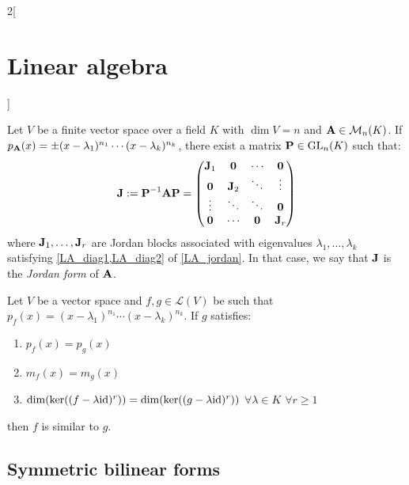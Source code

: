 \documentclass[../../../main.tex]{subfiles}
\begin{document}
\begin{multicols}{2}[\section{Linear algebra}]
\begin{proposition}
\begin{enumerate}
    \end{enumerate}
  \end{proposition}
  \begin{proposition}
    Let $V$ be a finite vector space over a field $K$ with $\dim V=n$ and $\boldsymbol{\mathrm{A}}\in\mathcal{M}_n(K)$. If $p_{\boldsymbol{\mathrm{A}}}(x)=\pm(x-\lambda_1)^{n_1}\cdots(x-\lambda_k)^{n_k}$, there exist a matrix $\boldsymbol{\mathrm{P}}\in\mathrm{GL}_n(K)$ such that:
    $$\boldsymbol{\mathrm{J}}:=\boldsymbol{\mathrm{P}}^{-1}\boldsymbol{\mathrm{A}}\boldsymbol{\mathrm{P}}=
      \begin{pmatrix}
        \boldsymbol{\mathrm{J}}_1 & \boldsymbol{\mathrm{0}}   & \cdots & \boldsymbol{\mathrm{0}}   \\
        \boldsymbol{\mathrm{0}}   & \boldsymbol{\mathrm{J}}_2 & \ddots & \vdots   \\
        \vdots   & \ddots   & \ddots & \boldsymbol{\mathrm{0}}   \\
        \boldsymbol{\mathrm{0}}   & \cdots   & \boldsymbol{\mathrm{0}} & \boldsymbol{\mathrm{J}}_r \\
      \end{pmatrix}
    $$
    where $\boldsymbol{\mathrm{J}}_1,\ldots,\boldsymbol{\mathrm{J}}_r$ are Jordan blocks associated with eigenvalues $\lambda_1,\ldots,\lambda_k$ satisfying \cref{LA_diag1,LA_diag2} of \cref{LA_jordan}. In that case, we say that $\boldsymbol{\mathrm{J}}$ is the \emph{Jordan form} of $\boldsymbol{\mathrm{A}}$.
  \end{proposition}
  \begin{theorem}
    Let $V$ be a vector space and $f,g\in\mathcal{L}(V)$ be such that $p_f(x)=(x-\lambda_1)^{n_1}\cdots(x-\lambda_k)^{n_k}$. If $g$ satisfies:
    \begin{enumerate}
      \item $p_f(x)=p_g(x)$
      \item $m_f(x)=m_g(x)$
      \item $\dim(\ker((f-\lambda \mathrm{id})^r))=\dim(\ker((g-\lambda \mathrm{id})^r))$ $\forall\lambda\in K$ $\forall r\geq 1$
    \end{enumerate}
    then $f$ is similar to $g$.
  \end{theorem}
  \subsection{Symmetric bilinear forms}

\end{multicols}
\end{document}
